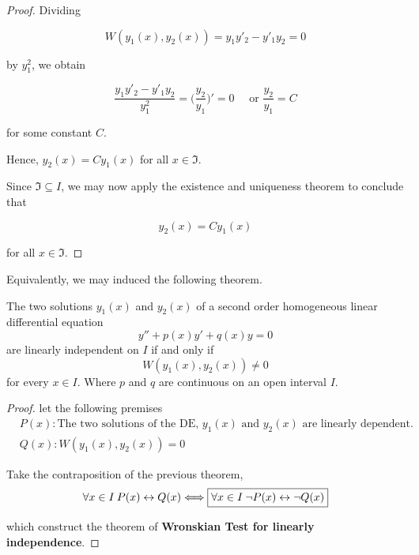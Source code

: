 \begin{proof}
     Dividing 

     \[
        W(y_1(x), y_2(x)) = y_1y'_2 - y'_1y_2 = 0
     \]

     by $y_1^2$, we obtain 

     \[
        \frac{y_1y'_2 - y'_1y_2}{y_1^2} = \biggl( \frac{y_2}{y_1} \biggr)' = 0 \quad 
        \text{ or } \frac{y_2}{y_1} = C
     \]

     for some constant $C$. 

     Hence, $y_2(x) = Cy_1(x)$ for all $x \in \mathfrak{I}$.

     Since $\mathfrak{I} \subseteq I$, we may now apply the existence and uniqueness theorem to conclude that 

     \[
        y_2(x) = Cy_1(x)
     \]

     for all $x \in \mathfrak{I}$.
\end{proof}

Equivalently, we may induced the following theorem.

\begin{theorem}
    The two solutions $y_1(x)$ and $y_2(x)$ of a second order homogeneous linear 
    differential equation
    \begin{equation}
        y'' + p(x)y' + q(x)y = 0
    \end{equation}
    are linearly independent on $I$ if and only if 
    \begin{equation}
        W(y_1(x), y_2(x)) \neq 0
    \end{equation}
    for every $x \in I$. Where $p$ and $q$ are continuous on an open interval $I$.
\end{theorem}

\begin{proof}
    let the following premises
    \begin{align*}
        &P(x): \text{The two solutions of the DE, } y_1(x) \text{ and } y_2(x) \text{ are linearly dependent.}\\
        &Q(x): W(y_1(x), y_2(x)) = 0
    \end{align*}

    Take the contraposition of the previous theorem,
    \begin{equation}
        \forall x \in I \> P(x) \leftrightarrow Q(x) \Longleftrightarrow \fbox{$\forall x \in I \> \lnot P(x) \leftrightarrow \lnot Q(x)$}
    \end{equation}

    which construct the theorem of \textbf{Wronskian Test for linearly independence}.
\end{proof}


